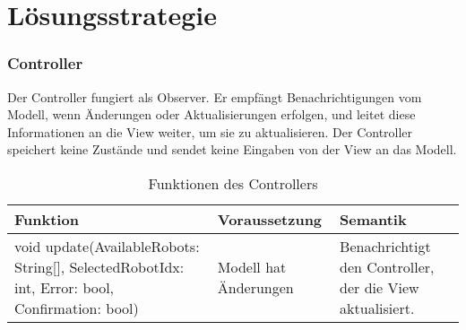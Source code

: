 \chapter{Lösungsstrategie}

\subsection{Controller}
Der Controller fungiert als Observer. 
Er empfängt Benachrichtigungen vom Modell, wenn Änderungen oder Aktualisierungen erfolgen, und leitet diese Informationen an die View weiter, um sie zu aktualisieren. 
Der Controller speichert keine Zustände und sendet keine Eingaben von der View an das Modell.

\begin{table}[h!]
    \centering
    \begin{tabular}{|p{5cm}|p{5cm}|p{5cm}|}
        \hline
        \textbf{Funktion} & \textbf{Voraussetzung} & \textbf{Semantik} \\
        \hline
        void update(AvailableRobots: String[], SelectedRobotIdx: int, Error: bool, Confirmation: bool) & Modell hat Änderungen & Benachrichtigt den Controller, der die View aktualisiert. \\
        \hline
    \end{tabular}
    \caption{Funktionen des Controllers}
    \label{tab:Controller}
\end{table}

\clearpage

